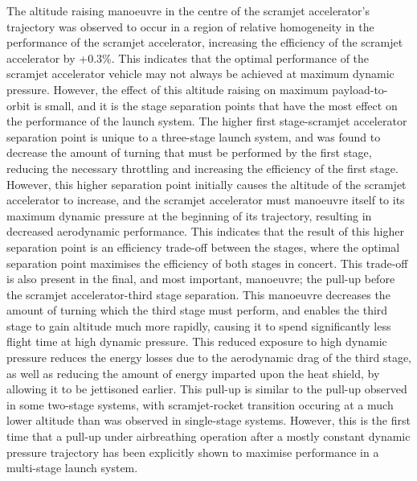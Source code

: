 The altitude raising manoeuvre in the centre of the scramjet accelerator's trajectory was observed to occur in a region of relative homogeneity in the performance of the scramjet accelerator, increasing the efficiency of the scramjet accelerator by +0.3\%. This indicates that the optimal performance of the scramjet accelerator vehicle may not always be achieved at maximum dynamic pressure.  
However, the effect of this altitude raising on maximum payload-to-orbit is small, and it is the stage separation points that have the most effect on the performance of the launch system.
The higher first stage-scramjet accelerator separation point is unique to a three-stage launch system, and was found to decrease the amount of turning that must be performed by the first stage,
reducing the necessary throttling and increasing the efficiency of the first stage. However, this higher separation point initially causes the altitude of the scramjet accelerator to increase, and the scramjet accelerator must manoeuvre itself to its maximum dynamic pressure at the beginning of its trajectory, resulting in decreased aerodynamic performance. This indicates that the result of this higher separation point is an efficiency trade-off between the stages, where the optimal separation point maximises the efficiency of both stages in concert. 
 This trade-off is also present in the final, and most important, manoeuvre; the pull-up before the scramjet accelerator-third stage separation. This manoeuvre decreases the amount of turning which the third stage must perform, and enables the third stage to gain altitude much more rapidly, causing it to spend significantly less flight time at high dynamic pressure. 
This reduced exposure to high dynamic pressure reduces the energy losses due to the aerodynamic drag of the third stage, as well as reducing the amount of energy imparted upon the heat shield, by allowing it to be jettisoned earlier. This pull-up is similar to the pull-up observed in some two-stage systems, with scramjet-rocket transition occuring at a much lower altitude than was observed in single-stage systems. However, this is the first time that a pull-up under airbreathing operation after a mostly constant dynamic pressure trajectory has been explicitly shown to maximise performance in a multi-stage launch system.

